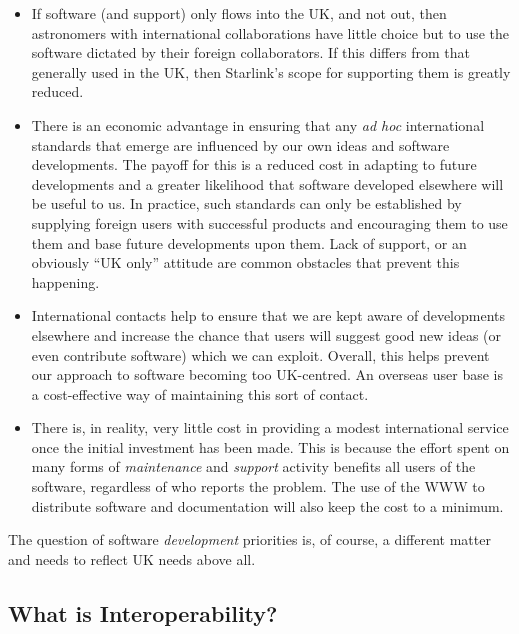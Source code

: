 \documentclass[twoside,11pt]{article}
\newcommand{\htmlref}[2]{#1}
\newcommand{\qt}[1]{``#1''}
\newcommand{\st}[1]{{\em{#1}}}
\newcommand{\qt}[1]{{\tt{"}}#1{\tt{"}}}
\newcommand{\dev}[1]{\htmlref{#1}{development}}
\newcommand{\mnt}[1]{\htmlref{#1}{maintenance}}
\newcommand{\spt}[1]{\htmlref{#1}{support}}
\begin{document}
\begin{itemize}
\item If software (and support) only flows into the UK, and
not out, then astronomers with international collaborations have
little choice but to use the software dictated by their foreign
collaborators. If this differs from that generally used in the UK,
then Starlink's scope for supporting them is greatly reduced.

\item There is an economic advantage in ensuring that any \st{ad hoc}
international standards that emerge are influenced by our own ideas
and software developments. The payoff for this is a reduced cost in
adapting to future developments and a greater likelihood that software
developed elsewhere will be useful to us. In practice, such standards
can only be established by supplying foreign users with successful
products and encouraging them to use them and base future developments
upon them. Lack of support, or an obviously \qt{UK only} attitude are
common obstacles that prevent this happening.

\item International contacts help to ensure that we are kept aware of
developments elsewhere and increase the chance that users will suggest
good new ideas (or even contribute software) which we can
exploit. Overall, this helps prevent our approach to software becoming
too UK-centred. An overseas user base is a cost-effective way of
maintaining this sort of contact.

\item There is, in reality, very little cost in providing a modest
international service once the initial investment has been made. This
is because the effort spent on many forms of \st{\mnt{maintenance}} and
\st{\spt{support}} activity benefits all users of the software, regardless
of who reports the problem.  The use of the WWW to distribute software
and documentation will also keep the cost to a minimum.

\end{itemize}

The question of software \st{\dev{development}} priorities is, of course, a
different matter and needs to reflect UK needs above all.

\subsection{\label{interop}What is Interoperability?}
\end{document}
